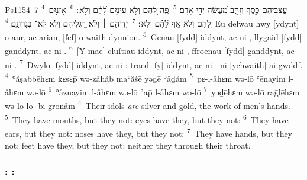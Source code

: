 \begin{example}{Ps}{115}{4–7}{}{}
	\quoling
	{%
		\textsuperscript{4}~עֲצַבֵּיהֶם כֶּ֣סֶף וְזָהָ֑ב מַ֝עֲשֵׂ֗ה יְדֵ֣י אָדָֽם׃
		\textsuperscript{5}~פֶּֽה־לָ֭הֶם וְלֹ֣א  עֵינַ֥יִם לָ֝הֶ֗ם וְלֹ֣א ׃
		\textsuperscript{6}~אָזְנַ֣יִם לָ֭הֶם וְלֹ֣א  אַ֥ף לָ֝הֶ֗ם וְלֹ֣א ׃
		\textsuperscript{7}~יְדֵיהֶ֤ם ׀ וְלֹ֬א  רַ֭גְלֵיהֶם וְלֹ֣א  לֹֽא־ בִּגְרוֹנָֽם׃
	}
	{%
		\textsuperscript{4}~Eu delwau hwy [ydynt] o aur, ac arian, [ſef] o waith dynnion.
		\textsuperscript{5}~Genau [ſydd] iddynt, ac ni , llygaid [ſydd] ganddynt, ac ni .
		\textsuperscript{6}~[Y mae] cluſtiau iddynt, ac ni , ffroenau [ſydd] ganddynt, ac ni .
		\textsuperscript{7}~Dwylo [ſydd] iddynt, ac ni : traed [ſy] iddynt, ac ni : ni  [ychwaith] ai gwddf.
	}
	{%
		\textsuperscript{4}~ʿăṣabbēhɛm kɛsɛp̄ wə-zåhåḇ maʿăśē yəḏē ʾåḏåm
		\textsuperscript{5}~pɛ-l-åhɛm wə-lō  ʿēnayim l-åhɛm wə-lō 
		\textsuperscript{6}~ʾåznayim l-åhɛm wə-lō  ʾap̄ l-åhɛm wə-lō 
		\textsuperscript{7}~yəḏēhɛm wə-lō  raḡlēhɛm wə-lō lō- bi-ḡrōnåm
	}
	{%
		\textsuperscript{4}~Their idols \textit{are} silver and gold, the work of men’s hands.
		\textsuperscript{5}~They have mouths, but they  not: eyes have they, but they  not:
		\textsuperscript{6}~They have ears, but they  not: noses have they, but they  not:
		\textsuperscript{7}~They have hands, but they  not: feet have they, but they  not: neither  they through their throat.
	}
\end{example}



\subsubsection{: :}
